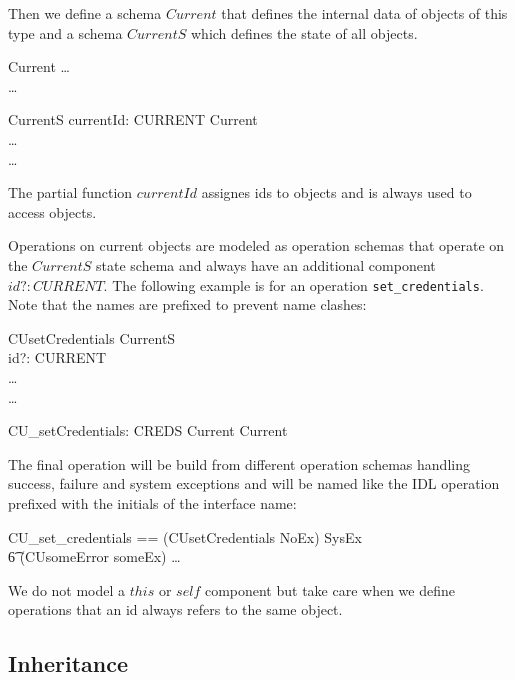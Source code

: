 Then we define a schema $Current$ that defines the internal data of objects of
this type and a schema $CurrentS$ which defines the state of all objects.
\begin{zedgroup}
  \begin{schema}{Current}
    \dots \\
    \where
    \dots \\
  \end{schema}
  \begin{schema}{CurrentS}
    currentId: CURRENT \pfun Current \\
    \dots \\
    \where
    \dots \\
  \end{schema}
\end{zedgroup}
The partial function $currentId$ assignes ids to objects and is always used to
access objects.

Operations on current objects are modeled as operation schemas that operate on
the $CurrentS$ state schema and always have an additional component $id?:
CURRENT$.  The following example is for an operation \texttt{set\_credentials}.
Note that the names are prefixed to prevent name clashes:
\begin{schema}{CUsetCredentials}
  \Delta CurrentS \\
  id?: CURRENT \\
  \dots \\
  \where
  \dots \\
\end{schema}
\begin{axdef}
  CU\_setCredentials: CREDS \cross Current \fun Current
\end{axdef}
The final operation will be build from different operation schemas handling
success, failure and system exceptions and will be named like the IDL operation
prefixed with the initials of the interface name:
\begin{zed}
  CU\_set\_credentials == (CUsetCredentials \land NoEx) \lor SysEx \\
  \t6 \lor (CUsomeError \land someEx) \lor \dots
\end{zed}

We do not model a $this$ or $self$ component but take care when we define
operations that an id always refers to the same object.


\subsection{Inheritance}

